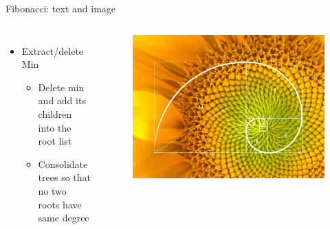 \begin{frame}[t]{Fibonacci: text and image}
    \vspace{1cm}
    \begin{columns}[onlytextwidth]
            \begin{itemize}
                \item {\color{blue}Extract/delete Min}
                 {
                    \begin{itemize}
                         \item \alert{Delete} {\color{blue}min} and \alert{add} its {\color{blue}children} into the root list \pause
                         \item {\color{gray}Consolidate trees so that no two roots have same degree}
                    \end{itemize}
                }
            \end{itemize}

        \centering
         {
        \begin{figure}
            \includegraphics[scale=0.12]{the-golden-ratio-teaser.jpg}
            \end{figure}
        }
    \end{columns}
\end{frame}